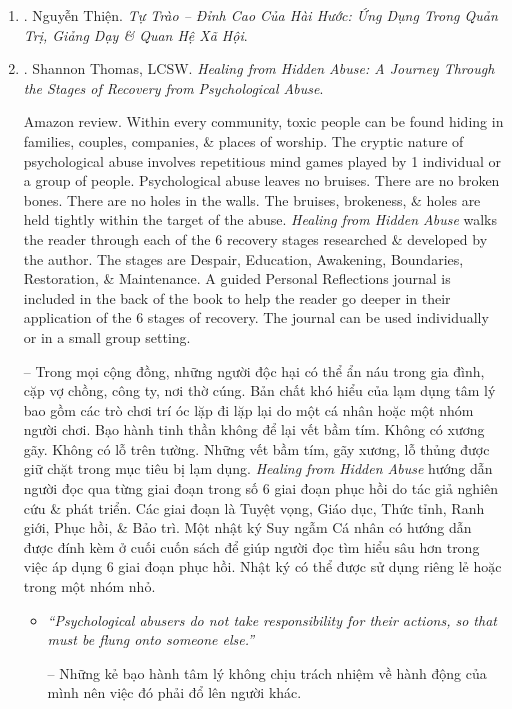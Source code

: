 \documentclass{article}
\begin{document}
\begin{enumerate}
	\item \cite{Thien_tu_trao}. {\sc Nguyễn Thiện.} {\it Tự Trào -- Đỉnh Cao Của Hài Hước: Ứng Dụng Trong Quản Trị, Giảng Dạy \& Quan Hệ Xã Hội}.\hfill{\sf[done]}
	
	\item \cite{Thomas_psychological_manipulation}. {\sc Shannon Thomas, LCSW}. {\it Healing from Hidden Abuse: A Journey Through the Stages of Recovery from Psychological Abuse}. {}
	
	{\sf Amazon review.} Within every community, toxic people can be found hiding in families, couples, companies, \& places of worship. The cryptic nature of psychological abuse involves repetitious mind games played by 1 individual or a group of people. Psychological abuse leaves no bruises. There are no broken bones. There are no holes in the walls. The bruises, brokeness, \& holes are held tightly within the target of the abuse. {\it Healing from Hidden Abuse} walks the reader through each of the 6 recovery stages researched \& developed by the author. The stages are Despair, Education, Awakening, Boundaries, Restoration, \& Maintenance. A guided Personal Reflections journal is included in the back of the book to help the reader go deeper in their application of the 6 stages of recovery. The journal can be used individually or in a small group setting.
	
	-- Trong mọi cộng đồng, những người độc hại có thể ẩn náu trong gia đình, cặp vợ chồng, công ty, nơi thờ cúng. Bản chất khó hiểu của lạm dụng tâm lý bao gồm các trò chơi trí óc lặp đi lặp lại do một cá nhân hoặc một nhóm người chơi. Bạo hành tinh thần không để lại vết bầm tím. Không có xương gãy. Không có lỗ trên tường. Những vết bầm tím, gãy xương, lỗ thủng được giữ chặt trong mục tiêu bị lạm dụng. {\it Healing from Hidden Abuse} hướng dẫn người đọc qua từng giai đoạn trong số 6 giai đoạn phục hồi do tác giả nghiên cứu \& phát triển. Các giai đoạn là Tuyệt vọng, Giáo dục, Thức tỉnh, Ranh giới, Phục hồi, \& Bảo trì. Một nhật ký Suy ngẫm Cá nhân có hướng dẫn được đính kèm ở cuối cuốn sách để giúp người đọc tìm hiểu sâu hơn trong việc áp dụng 6 giai đoạn phục hồi. Nhật ký có thể được sử dụng riêng lẻ hoặc trong một nhóm nhỏ.
	\begin{itemize}
		\item {\it``Psychological abusers do not take responsibility for their actions, so that must be flung onto someone else.''}
		
		-- Những kẻ bạo hành tâm lý không chịu trách nhiệm về hành động của mình nên việc đó phải đổ lên người khác.
		

\end{itemize}
\end{enumerate}
\end{document}
